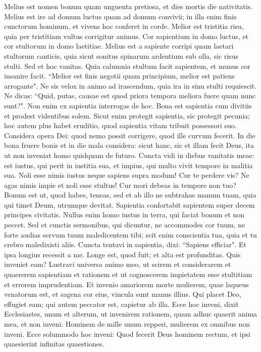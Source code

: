 \begin{biblechapter}  
\verse Melius est nomen bonum quam unguenta pretiosa, et dies mortis die nativitatis. 
\verse Melius est ire ad domum luctus quam ad domum convivii; in illa enim finis cunctorum hominum, et vivens hoc conferet in corde. 
\verse Melior est tristitia risu, quia per tristitiam vultus corrigitur animus. 
\verse Cor sapientium in domo luctus, et cor stultorum in domo laetitiae. 
\verse Melius est a sapiente corripi quam laetari stultorum canticis, 
\verse quia sicut sonitus spinarum ardentium sub olla, sic risus stulti. Sed et hoc vanitas. 
\verse Quia calumnia stultum facit sapientem, et munus cor insanire facit. 
\verse “Melior est finis negotii quam principium, melior est patiens arrogante". 
\verse Ne sis velox in animo ad irascendum, quia ira in sinu stulti requiescit.  
\verse Ne dicas: “Quid, putas, causae est quod priora tempora meliora fuere quam nunc sunt?". Non enim ex sapientia interrogas de hoc. 
\verse Bona est sapientia cum divitiis et prodest videntibus solem. 
\verse Sicut enim protegit sapientia, sic protegit pecunia; hoc autem plus habet eruditio, quod sapientia vitam tribuit possessori suo. 
\verse Considera opera Dei: quod nemo possit corrigere, quod ille curvum fecerit. 
\verse In die bona fruere bonis et in die mala considera: sicut hanc, sic et illam fecit Deus, ita ut non inveniat homo quidquam de futuro. 
\verse Cuncta vidi in diebus vanitatis meae: est iustus, qui perit in iustitia sua, et impius, qui multo vivit tempore in malitia sua. 
\verse Noli esse nimis iustus neque sapiens supra modum! Cur te perdere vis? 
\verse Ne agas nimis impie et noli esse stultus! Cur mori debeas in tempore non tuo? 
\verse Bonum est ut, quod habes, teneas, sed et ab illo ne subtrahas manum tuam, quia qui timet Deum, utrumque devitat. 
\verse Sapientia confortabit sapientem super decem principes civitatis. 
\verse Nullus enim homo iustus in terra, qui faciat bonum et non peccet. 
\verse Sed et cunctis sermonibus, qui dicuntur, ne accommodes cor tuum, ne forte audias servum tuum maledicentem tibi; 
\verse scit enim conscientia tua, quia et tu crebro maledixisti aliis. 
\verse Cuncta tentavi in sapientia, dixi: “Sapiens efficiar". 
\verse Et ipsa longius recessit a me. Longe est, quod fuit; et alta est profunditas. Quis inveniet eam? 
\verse Lustravi universa animo meo, ut scirem et considerarem et quaererem sapientiam et rationem et ut cognoscerem impietatem esse stultitiam et errorem imprudentiam. 
\verse Et invenio amariorem morte mulierem, quae laqueus venatorum est, et sagena cor eius, vincula sunt manus illius. Qui placet Deo, effugiet eam; qui autem peccator est, capietur ab illa. 
\verse Ecce hoc inveni, dixit Ecclesiastes, unum et alterum, ut invenirem rationem, 
\verse quam adhuc quaerit anima mea, et non inveni: Hominem de mille unum repperi, mulierem ex omnibus non inveni. 
\verse Ecce solummodo hoc inveni: Quod fecerit Deus hominem rectum, et ipsi quaesierint infinitas quaestiones. 
\end{biblechapter}

